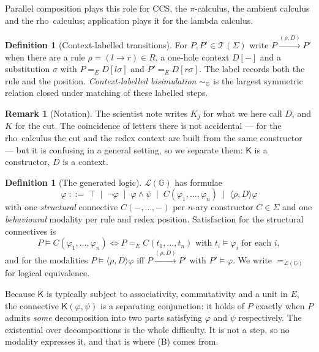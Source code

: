 \documentclass[11pt]{article}
\theoremstyle{plain}
\theoremstyle{definition}
\newtheorem{definition}[theorem]{Definition}
\newtheorem{remark}[theorem]{Remark}
\newcommand{\rhoc}{\textsf{rho}}
\newcommand{\Kc}{\mathsf{K}}
\newcommand{\Gg}{\mathbb{G}}
\newcommand{\Lo}{\mathcal{L}}
\newcommand{\bis}{\sim}
\newcommand{\Terms}{\mathcal{T}}
\begin{document}
Parallel composition plays this role for CCS, the $\pi$-calculus, the ambient calculus and the \rhoc\
calculus; application plays it for the lambda calculus.

\begin{definition}[Context-labelled transitions]
For $P, P' \in \Terms(\Sigma)$ write $P \xrightarrow{(\rho, D)} P'$ when there are a rule
$\rho = (l \to r) \in R$, a one-hole context $D[-]$ and a substitution $\sigma$ with
$P =_E D[l\sigma]$ and $P' =_E D[r\sigma]$. The label records both the rule and the position.
\emph{Context-labelled bisimulation} $\bis_\Gg$ is the largest symmetric relation closed under
matching of these labelled steps.
\end{definition}

\begin{remark}[Notation]
The scientist note \cite{ScientistNote} writes $K_j$ for what we here call $D$, and $K$ for the cut.
The coincidence of letters there is not accidental --- for the \rhoc\ calculus the cut and the redex
context are built from the same constructor --- but it is confusing in a general setting, so we
separate them: $\Kc$ is a constructor, $D$ is a context.
\end{remark}

\begin{definition}[The generated logic]
$\Lo(\Gg)$ has formulae
\[
\varphi \;::=\; \top \;\mid\; \neg\varphi \;\mid\; \varphi \wedge \psi
\;\mid\; C(\varphi_1,\dots,\varphi_n) \;\mid\; \langle \rho, D \rangle \varphi
\]
with one \emph{structural} connective $C(-,\dots,-)$ per $n$-ary constructor $C \in \Sigma$ and one
\emph{behavioural} modality per rule and redex position. Satisfaction for the structural connectives is
\[
P \models C(\varphi_1,\dots,\varphi_n)
\iff
P =_E C(t_1,\dots,t_n) \text{ with } t_i \models \varphi_i \text{ for each } i,
\]
and for the modalities $P \models \langle \rho, D\rangle \varphi$ iff $P \xrightarrow{(\rho,D)} P'$
with $P' \models \varphi$. We write $=_{\Lo(\Gg)}$ for logical equivalence.
\end{definition}

Because $\Kc$ is typically subject to associativity, commutativity and a unit in $E$, the connective
$\Kc(\varphi, \psi)$ is a separating conjunction: it holds of $P$ exactly when $P$ admits \emph{some}
decomposition into two parts satisfying $\varphi$ and $\psi$ respectively. The existential over
decompositions is the whole difficulty. It is not a step, so no modality expresses it, and that is
where (B) comes from.
\end{document}
